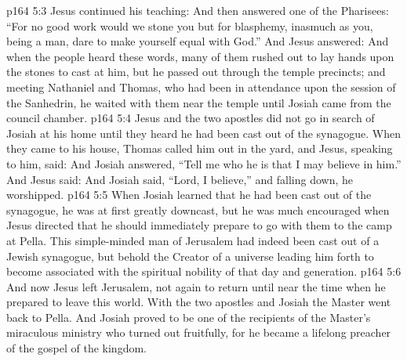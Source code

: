 \vs p164 5:3 Jesus continued his teaching:  And then answered one of the Pharisees: “For no good work would we stone you but for blasphemy, inasmuch as you, being a man, dare to make yourself equal with God.” And Jesus answered:  And when the people heard these words, many of them rushed out to lay hands upon the stones to cast at him, but he passed out through the temple precincts; and meeting Nathaniel and Thomas, who had been in attendance upon the session of the Sanhedrin, he waited with them near the temple until Josiah came from the council chamber.
\vs p164 5:4 Jesus and the two apostles did not go in search of Josiah at his home until they heard he had been cast out of the synagogue. When they came to his house, Thomas called him out in the yard, and Jesus, speaking to him, said:  And Josiah answered, “Tell me who he is that I may believe in him.” And Jesus said:  And Josiah said, “Lord, I believe,” and falling down, he worshipped.
\vs p164 5:5 When Josiah learned that he had been cast out of the synagogue, he was at first greatly downcast, but he was much encouraged when Jesus directed that he should immediately prepare to go with them to the camp at Pella. This simple\hyp{}minded man of Jerusalem had indeed been cast out of a Jewish synagogue, but behold the Creator of a universe leading him forth to become associated with the spiritual nobility of that day and generation.
\vs p164 5:6 And now Jesus left Jerusalem, not again to return until near the time when he prepared to leave this world. With the two apostles and Josiah the Master went back to Pella. And Josiah proved to be one of the recipients of the Master’s miraculous ministry who turned out fruitfully, for he became a lifelong preacher of the gospel of the kingdom.
\quizlink
